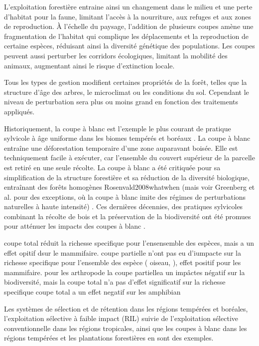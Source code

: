 L'exploitation forestière entraine ainsi un changement dans le milieu et une perte d'habitat pour la faune, limitant l'accès à la nourriture, aux refuges et aux zones de reproduction. 
À l'échelle du paysage, l'addition de plusieurs coupes amène une fragmentation de l'habitat qui complique les déplacements et la reproduction de certaine espèces, réduisant ainsi la diversité génétique des populations. 
Les coupes peuvent aussi perturber les corridors écologiques, limitant la mobilité des animaux, augmentant ainsi le risque d'extinction locale. 



Tous les types de gestion modifient certaines propriétés de la forêt, telles que la structure d'âge des arbres, le microclimat ou les conditions du sol.
Cependant le niveau de perturbation sera plus ou moins grand en fonction des traitements appliqués.

Historiquement, la coupe à blanc est l'exemple le plus courant de pratique sylvicole à âge uniforme dans les biomes tempérés et boréaux \citep{Fedrowitz2014Canretention}. 
La coupe à blanc entraîne une déforestation temporaire d'une zone auparavant boisée.
Elle est techniquement facile à exécuter, car l'ensemble du couvert supérieur de la parcelle est retiré en une seule récolte. 
La coupe à blanc a été critiquée pour sa simplification de la structure forestière et sa réduction de la diversité biologique, entraînant des forêts homogènes Rosenvald2008whatwhen \citep{Rosenvald2008whatwhen} (mais voir Greenberg et al. pour des exceptions, où la coupe à blanc imite des régimes de perturbations naturelles à haute intensité) \citep{Greenberg1995comparisonbird}. 
Ces dernières décennies, des pratiques sylvicoles combinant la récolte de bois et la préservation de la biodiversité ont été promues pour atténuer les impacts des coupes à blanc \citep{Gustafsson2012Retentionforestry}.

coupe total réduit la richesse specifique pour l'ensensemble des espèces, mais a un effet opitif dsur le mammifaire.
coupe partielle n'ont pas eu d'iumpacte sur la richesse specifique pour l'ensemble des espèce ( oiseau, ), effet positif pour les mammifaire.
pour les arthropode la coupe partiellea un impâctes négatif sur la biodiversité, mais la coupe total n'a pas d'effet significatif sur la richesse specifique
coupe total a un effet negatif sur les amphibian

Les systèmes de sélection et de rétention dans les régions tempérées et boréales, l'exploitation sélective à faible impact (RIL) suivie de l'exploitation sélective conventionnelle dans les régions tropicales, ainsi que les coupes à blanc dans les régions tempérées et les plantations forestières en sont des exemples. 


